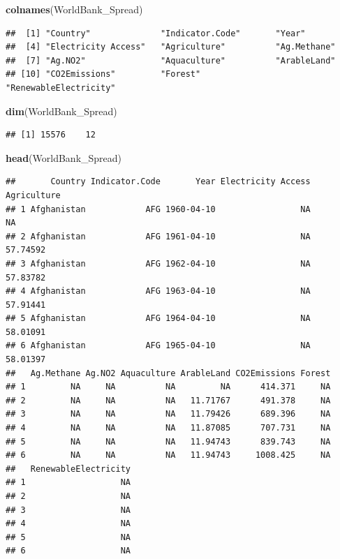 \documentclass[12pt,]{article}
\newenvironment{Shaded}{\begin{snugshade}}{\end{snugshade}}
\newcommand{\KeywordTok}[1]{\textcolor[rgb]{0.13,0.29,0.53}{\textbf{#1}}}
\newcommand{\NormalTok}[1]{#1}
\begin{document}
\begin{Shaded}
\begin{Highlighting}[]
\KeywordTok{colnames}\NormalTok{(WorldBank_Spread)}
\end{Highlighting}
\end{Shaded}

\begin{verbatim}
##  [1] "Country"              "Indicator.Code"       "Year"                
##  [4] "Electricity Access"   "Agriculture"          "Ag.Methane"          
##  [7] "Ag.NO2"               "Aquaculture"          "ArableLand"          
## [10] "CO2Emissions"         "Forest"               "RenewableElectricity"
\end{verbatim}

\begin{Shaded}
\begin{Highlighting}[]
\KeywordTok{dim}\NormalTok{(WorldBank_Spread)}
\end{Highlighting}
\end{Shaded}

\begin{verbatim}
## [1] 15576    12
\end{verbatim}

\begin{Shaded}
\begin{Highlighting}[]
\KeywordTok{head}\NormalTok{(WorldBank_Spread)}
\end{Highlighting}
\end{Shaded}

\begin{verbatim}
##       Country Indicator.Code       Year Electricity Access Agriculture
## 1 Afghanistan            AFG 1960-04-10                 NA          NA
## 2 Afghanistan            AFG 1961-04-10                 NA    57.74592
## 3 Afghanistan            AFG 1962-04-10                 NA    57.83782
## 4 Afghanistan            AFG 1963-04-10                 NA    57.91441
## 5 Afghanistan            AFG 1964-04-10                 NA    58.01091
## 6 Afghanistan            AFG 1965-04-10                 NA    58.01397
##   Ag.Methane Ag.NO2 Aquaculture ArableLand CO2Emissions Forest
## 1         NA     NA          NA         NA      414.371     NA
## 2         NA     NA          NA   11.71767      491.378     NA
## 3         NA     NA          NA   11.79426      689.396     NA
## 4         NA     NA          NA   11.87085      707.731     NA
## 5         NA     NA          NA   11.94743      839.743     NA
## 6         NA     NA          NA   11.94743     1008.425     NA
##   RenewableElectricity
## 1                   NA
## 2                   NA
## 3                   NA
## 4                   NA
## 5                   NA
## 6                   NA
\end{verbatim}
\end{document}
